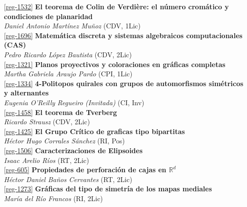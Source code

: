 \begin{multicols}{2}
\noindent  \ref{reg-1532}  {\bfseries El teorema de Colin de Verdi\`ere: el n\'umero crom\'atico y condiciones de planaridad}\\
{\slshape  Daniel Antonio Mart\'inez Mu\~noz} {\footnotesize (CDV, 1Lic)}\\

\noindent  \ref{reg-1696}  {\bfseries Matem\'atica discreta y sistemas algebraicos computacionales (CAS)}\\
{\slshape  Pedro Ricardo L\'opez Bautista} {\footnotesize (CDV, 2Lic)}\\

\noindent  \ref{reg-1321}  {\bfseries Planos proyectivos y coloraciones en gr\'aficas completas}\\
{\slshape  Martha Gabriela Araujo Pardo} {\footnotesize (CPI, 1Lic)}\\

\noindent  \ref{reg-1334}  {\bfseries 4-Politopos quirales con grupos de automorfismos sim\'etricos y alternantes}\\
{\slshape  Eugenia  O'Reilly Regueiro (Invitada)} {\footnotesize (CI, Inv)}\\

\noindent  \ref{reg-1458}  {\bfseries El teorema de Tverberg}\\
{\slshape  Ricardo  Strausz} {\footnotesize (CDV, 2Lic)}\\

\noindent  \ref{reg-1425}  {\bfseries El Grupo Cr\'itico de graficas tipo bipartitas}\\
{\slshape  H\'ector Hugo Corrales S\'anchez} {\footnotesize (RI, Pos)}\\

\noindent  \ref{reg-1506}  {\bfseries Caracterizaciones de Elipsoides}\\
{\slshape  Isaac Arelio R\'ios} {\footnotesize (RT, 2Lic)}\\

\noindent  \ref{reg-605}  {\bfseries Propiedades de perforaci\'on de cajas en $\mathbb{R}^d$}\\
{\slshape  H\'ector Daniel Ba\~nos Cervantes} {\footnotesize (RT, 2Lic)}\\

\noindent  \ref{reg-1273}  {\bfseries Gr\'aficas del tipo de simetr\'ia de los mapas mediales}\\
{\slshape  Mar\'ia  del R\'io Francos} {\footnotesize (RI, 2Lic)}\\


\end{multicols}

